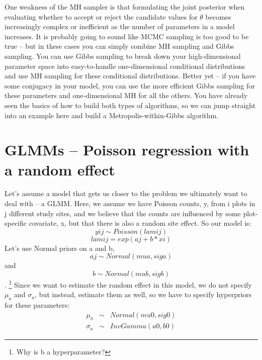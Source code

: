 One weakness of the MH sampler is that formulating the joint posterior when evaluating whether to accept or reject the candidate values for $\theta$ becomes increasingly complex or inefficient as the number of parameters in a model increases. It is probably going to sound like MCMC sampling is too good to be true – but in these cases you can simply combine MH sampling and Gibbs sampling. You can use Gibbs sampling to break down your high-dimensional parameter space into easy-to-handle one-dimensional conditional distributions and use MH sampling for these conditional distributions. Better yet – if you have some conjugacy in your model, you can use the more efficient Gibbs sampling for these parameters and one-dimensional MH for all the others. You have already seen the basics of how to build both types of algorithms, so we can jump straight into an example here and build a Metropolis-within-Gibbs algorithm.

\section{ GLMMs – Poisson regression with a random effect }

Let's assume a model that gets us closer to the problem we ultimately want to deal with – a GLMM. Here, we assume we have Poisson counts, y, from i plots in j different study sites, and we believe that the counts are influenced by some plot-specific covariate, x, but that there is also a random site effect. So our model is:
\[
yij \sim Poisson (lamij)
\]
\[
lamij = exp (aj + b*xi)
\]
Let's use Normal priors on a and b,  \[
aj \sim Normal (mua, siga)
\]
and
\[
b \sim Normal (mub, sigb)
\].
\footnote{Why is b a hyperparameter?}
Since we want to estimate the random effect in this model, we do not
specify $\mu_a$ and $\sigma_a$, but instead, estimate them as well, so we have
to specify hyperpriors for these parameters:
\begin{eqnarray*}
\mu_a  &\sim &  Normal(mu0, sig0)  \\
\sigma_{a} & \sim & InvGamma(a0, b0)
\end{eqnarray*}

